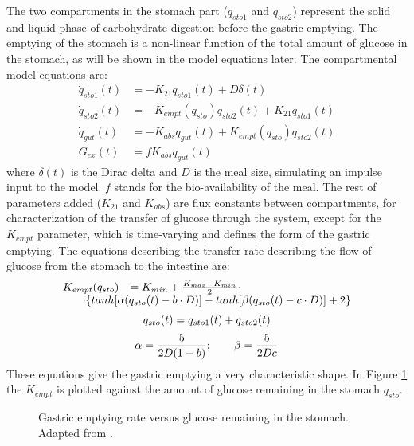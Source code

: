 The two compartments in the stomach part ($q_{sto1}$ and $q_{sto2}$) represent the solid and liquid phase of carbohydrate digestion before the gastric emptying. The emptying of the stomach is a non-linear function of the total amount of glucose in the stomach, as will be shown in the model equations later. The compartmental model equations are:
\begin{align}
  \dot{q}_{sto1}(t) &=-K_{21}q_{sto1}(t)+D\delta (t)\label{eq:dallaman1}\\
  \dot{q}_{sto2}(t) &=-K_{empt}(q_{sto})q_{sto2}(t)+K_{21}q_{sto1}(t)\label{eq:dallaman2}\\
  \dot{q}_{gut}(t) &=-K_{abs}q_{gut}(t)+K_{empt}(q_{sto})q_{sto2}(t)\label{eq:dallaman3}\\
  G_{ex}(t) &=fK_{abs}q_{gut}(t)\label{eq:dallaman4}
\end{align}
where $\delta (t)$ is the Dirac delta and $D$ is the meal size, simulating an impulse input to the model. $f$ stands for the bio-availability of the meal. The rest of parameters added ($K_{21}$ and $K_{abs}$) are flux constants between compartments, for characterization of the transfer of glucose through the system, except for the $K_{empt}$ parameter, which is time-varying and defines the form of the gastric emptying. The equations describing the transfer rate describing the flow of glucose from the stomach to the intestine are:
\begin{equation} \label{eq:dallaman5}
\begin{array}{ll}
  K_{empt}(q_{sto}) &= K_{min}+\frac{K_{max}-K_{min}}{2}\cdot\\
  & \hskip -1.5cm \cdot \{ tanh[\alpha (q_{sto}(t)-b\cdot D)]-tanh[\beta (q_{sto}(t)-c\cdot D)]+2\}\\
\end{array}
\end{equation}
\begin{equation} \label{eq:dallaman6}
  q_{sto}(t) =q_{sto1}(t)+q_{sto2}(t)\\
\end{equation}
\begin{equation} \label{eq:dallaman7}
  \alpha = \frac{5}{2D(1-b)}; \qquad   \beta = \frac{5}{2Dc} \\
\end{equation}
These equations give the gastric emptying a very characteristic shape. In Figure \ref{fig:dallaman2} the $K_{empt}$ is plotted against the amount of glucose remaining in the stomach $q_{sto}$.

\begin{figure}[hbtp]
\centering
{}\caption{Gastric emptying rate versus glucose remaining in the stomach. Adapted from \cite{man2006system}.}
\label{fig:dallaman2}
\end{figure}

